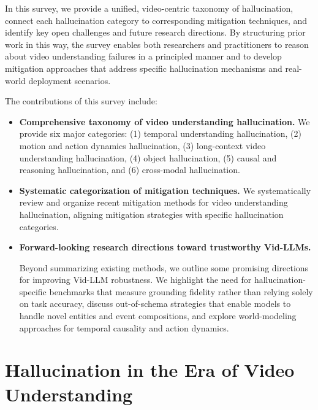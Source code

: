 \documentclass[10pt]{article} %
\begin{document}
In this survey, we provide a unified, video-centric taxonomy of hallucination, connect each hallucination category to corresponding mitigation techniques, and identify key open challenges and future research directions. By structuring prior work in this way, the survey enables both researchers and practitioners to reason about video understanding failures in a principled manner and to develop mitigation approaches that address specific hallucination mechanisms and real-world deployment scenarios.

The contributions of this survey include:
\begin{itemize}
    \item \textbf{Comprehensive taxonomy of video understanding hallucination.}
    We provide six major categories: (1) {temporal understanding hallucination}, (2) {motion and action dynamics hallucination}, (3) {long-context video understanding hallucination}, (4) {object hallucination}, (5) {causal and reasoning hallucination}, and (6) {cross-modal hallucination}. %

\item \textbf{Systematic categorization of mitigation techniques.}
    We systematically review and organize recent mitigation methods for video understanding hallucination, aligning mitigation strategies with specific hallucination categories. %

\item \textbf{Forward-looking research directions toward trustworthy Vid-LLMs.}

    Beyond summarizing existing methods, we outline some promising directions for improving Vid-LLM robustness. We highlight the need for hallucination-specific benchmarks that measure grounding fidelity rather than relying solely on task accuracy, discuss out-of-schema strategies that enable models to handle novel entities and event compositions, and explore world-modeling approaches for temporal causality and action dynamics. %
\end{itemize}

\section{Hallucination in the Era of Video Understanding}\label{sec:hallucination-def}
\end{document}
